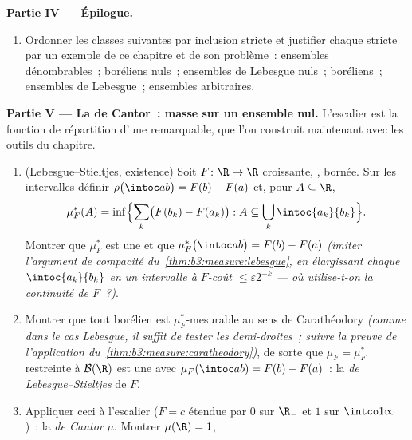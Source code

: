 \begin{problem}
\medskip
\noindent\textbf{Partie IV --- Épilogue.}
\begin{enumerate}[resume]
  \item Ordonner les classes suivantes par inclusion stricte
        et justifier chaque stricte par un exemple de ce
        chapitre et de son problème~: ensembles dénombrables~;
        boréliens nuls~; ensembles de Lebesgue nuls~;
        boréliens~; ensembles de Lebesgue~; ensembles
        arbitraires.
\end{enumerate}

\medskip
\noindent\textbf{Partie V --- La  de Cantor~: masse sur
un ensemble nul.} L'escalier est la fonction de répartition
d'une  remarquable, que l'on construit maintenant avec
les outils du chapitre.
\begin{enumerate}[resume]
  \item (Lebesgue--Stieltjes, existence) Soit $F\colon\R\to\R$
        croissante, , bornée. Sur les intervalles
         définir $\rho\bigl(\intoc ab\bigr) =
        F(b) - F(a)$ et, pour $A \subseteq \R$,
        \[
        \mu_F^*(A) = \inf\Bigl\{\sum_k\bigl(F(b_k) -
        F(a_k)\bigr) : A \subseteq
        \bigcup_k\intoc{a_k}{b_k}\Bigr\} .
        \]
        Montrer que $\mu_F^*$ est une  et
        que $\mu_F^*\bigl(\intoc ab\bigr) = F(b) - F(a)$
        \emph{(imiter l'argument de compacité
        du~\cref{thm:b3:measure:lebesgue}, en élargissant
        chaque $\intoc{a_k}{b_k}$ en un intervalle  à
        $F$-coût $\leq \varepsilon2^{-k}$ --- où utilise-t-on
        la continuité de $F$~?)}.
  \item Montrer que tout borélien est $\mu_F^*$-mesurable au
        sens de Carathéodory \emph{(comme dans le cas
        Lebesgue, il suffit de tester les demi-droites~;
        suivre la preuve de l'application
        du~\cref{thm:b3:measure:caratheodory})}, de sorte que
        $\mu_F = \mu_F^*$ restreinte à $\mathcal B(\R)$ est
        une  avec $\mu_F(\intoc ab) = F(b) - F(a)$~: la
        \emph{ de Lebesgue--Stieltjes} de $F$.
  \item Appliquer ceci à l'escalier ($F = c$ étendue par $0$
        sur $\R_-$ et $1$ sur $\intco1\infty$)~: la
        \emph{ de Cantor} $\mu$. Montrer $\mu(\R) = 1$,

\end{enumerate}
\end{problem}
